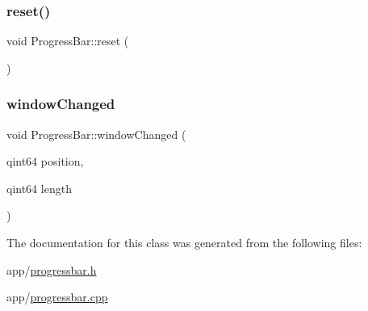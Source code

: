 \subsubsection{\texorpdfstring{reset()}{reset()}}
{\footnotesize\ttfamily void Progress\+Bar\+::reset (\begin{DoxyParamCaption}{ }\end{DoxyParamCaption})}

\hypertarget{class_progress_bar_a5df10736f27e956424de9cd77dd11956}{}\label{class_progress_bar_a5df10736f27e956424de9cd77dd11956} 
\subsubsection{\texorpdfstring{window\+Changed}{windowChanged}}
{\footnotesize\ttfamily void Progress\+Bar\+::window\+Changed (\begin{DoxyParamCaption}\item[{qint64}]{position,  }\item[{qint64}]{length }\end{DoxyParamCaption})\hspace{0.3cm}{\ttfamily [slot]}}



The documentation for this class was generated from the following files\+:\begin{DoxyCompactItemize}
\item 
app/\hyperlink{progressbar_8h}{progressbar.\+h}\item 
app/\hyperlink{progressbar_8cpp}{progressbar.\+cpp}\end{DoxyCompactItemize}
